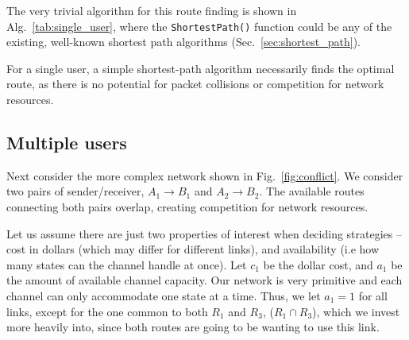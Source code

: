 \documentclass[aps,rmp,twocolumn,amsmath,amssymb,nofootinbib,superscriptaddress]{revtex4}
\begin{document}
The very trivial algorithm for this route finding is shown in Alg.~\ref{tab:single_user}, where the {\tt ShortestPath()} function could be any of the existing, well-known shortest path algorithms (Sec.~\ref{sec:shortest_path}).
\begin{table}[!htb]
\caption{For a single user, a simple shortest-path algorithm necessarily finds the optimal route, as there is no potential for packet collisions or competition for network resources.} \label{tab:single_user}
\end{table}

%
%

\subsection{Multiple users} \label{sec:two_user}

Next consider the more complex network shown in Fig.~\ref{fig:conflict}. We consider two pairs of sender/receiver, \mbox{$A_1\to B_1$} and \mbox{$A_2\to B_2$}. The available routes connecting both pairs overlap, creating competition for network resources.

Let us assume there are just two properties of interest when deciding strategies -- cost in dollars (which may differ for different links), and availability (i.e how many states can the channel handle at once). Let $c_1$ be the dollar cost, and \mbox{$a_1$} be the amount of available channel capacity. Our network is very primitive and each channel can only accommodate one state at a time. Thus, we let \mbox{$a_1=1$} for all links, except for the one common to both $R_1$ and $R_3$, \mbox{($R_1\cap R_3$)}, which we invest more heavily into, since both routes are going to be wanting to use this link.
\end{document}
